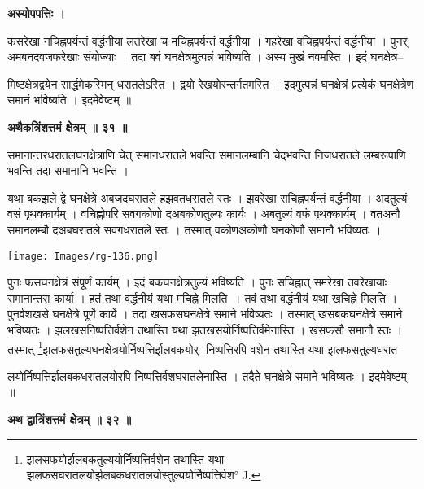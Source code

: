 \documentclass[11pt, openany]{book}
\begin{document}
\begin{center}
\textbf{ अस्योपपत्तिः ।}
\end{center}
\vspace{2mm}

कसरेखा नचिह्नपर्यन्तं वर्द्धनीया लतरेखा च मचिह्नपर्यन्तं वर्द्धनीया । गहरेखा
वचिह्नपर्यन्तं वर्द्धनीया । पुनर् अमबनदवजफरेखाः संयोज्याः । तदा बवं घनक्षेत्रमुत्पन्नं भविष्यति । अस्य मुखं नवमस्ति । इदं
घनक्षेत्र--

\newpage
\noindent मिष्टक्षेत्रद्वयेन सार्द्धमेकस्मिन् धरातलेऽस्ति । द्वयो
रेखयोरन्तर्गतमस्ति । इदमुत्पन्नं घनक्षेत्रं प्रत्येकं घनक्षेत्रेण समानं भविष्यति ।
इदमेवेष्टम् ॥\\
\vspace{3mm}

\begin{center}
\textbf{\large अथैकत्रिंशत्तमं क्षेत्रम् ॥ ३१ ॥}
\end{center}
\vspace{5mm}

{\ab समानान्तरधरातलघनक्षेत्राणि चेत् समानधरातले भवन्ति समानलम्बानि चेद्भवन्ति निजधरातले लम्बरूपाणि भवन्ति तदा समानानि भवन्ति ।}\\
\vspace{3mm}

 यथा बकझले द्वे घनक्षेत्रे अबजदघरातले हझवतधरातले स्तः । झवरेखा सचिह्नपर्यन्तं वर्द्धनीया । अदतुल्यं वसं पृथक्कार्यम् । वचिह्नोपरि सवगकोणो दअबकोणतुल्यः कार्यः । अबतुल्यं वफं पृथक्कार्यम् । वतअनौ समानलम्बौ दअबघरातले सवगधरातले स्तः । तस्मात् वकोणअकोणौ घनकोणौ समानौ भविष्यतः । 
 \begin{center}
 \texttt{[image: Images/rg-136.png]}   
\end{center} 

 पुनः फसघनक्षेत्रं संपूर्णं कार्यम् । इदं बकघनक्षेत्रतुल्यं
भविष्यति । पुनः सचिह्नात् समरेखा तवरेखायाः समानान्तरा कार्या । हतं
तथा वर्द्धनीयं यथा मचिह्ने मिलति~। तवं तथा वर्द्धनीयं यथा
खचिह्ने मिलति । पुनर्वशखसे घनक्षेत्रे पूर्णे कार्ये । तदा खसफसघनक्षेत्रे समाने भविष्यतः । तस्मात् खसबकघनक्षेत्रे समाने भविष्यतः । झलखसनिष्पत्तिर्वशेन तथास्ति यथा झतखसयोर्निष्पत्तिर्वमेनास्ति । खसफसौ समानौ स्तः । तस्मात् \renewcommand{\thefootnote}{१}\footnote{झलसफयोर्झलबकतुल्ययोर्निष्पत्तिर्वशेन तथास्ति यथा
झलफसघरातलयोर्झलबकधरातलयोस्तुल्ययोर्निष्पत्तिर्वश° {\en J.}}झलफसतुल्यघनक्षेत्रयोर्निष्पत्तिर्झलबकयोर्-
निष्पत्तिरपि वशेन तथास्ति यथा झलफसतुल्यधरात--

\newpage
\noindent लयोर्निष्पत्तिर्झलबकधरातलयोरपि निष्पत्तिर्वशघरातलेनास्ति ।
तदैते घनक्षेत्रे समाने भविष्यतः । इदमेवेष्टम् ॥\\
\begin{center}
\textbf{\large अथ द्वात्रिंशत्तमं क्षेत्रम् ॥ ३२ ॥}
\end{center}
\vspace{2mm}
\end{document}

